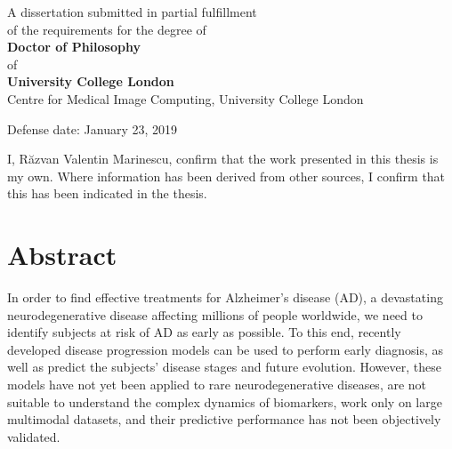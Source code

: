 \documentclass[12pt,a4paper,twoside]{book}
\begin{document}
\begin{titlepage}
\begin{center}
{\vfill
 
A dissertation submitted in partial fulfillment \\
of the requirements for the degree of\\[0.3cm]
\textbf{Doctor of Philosophy}\\[0.3cm]
of\\[0.3cm]
\textbf{University College London}\\[1cm]

Centre for Medical Image Computing, University College London
 
 \vfill
% 
% 

{\Large Defense date: January 23, 2019} %

}
\end{center}
\end{titlepage}


\clearpage


I, R\u{a}zvan Valentin Marinescu, confirm that the work presented in this thesis is my own. Where information has been derived from other sources, I confirm that this has been indicated in the thesis.

\clearpage


\chapter*{Abstract}

In order to find effective treatments for Alzheimer's disease (AD), a devastating neurodegenerative disease affecting millions of people worldwide, we need to identify subjects at risk of AD as early as possible. To this end, recently developed disease progression models can be used to perform early diagnosis, as well as predict the subjects' disease stages and future evolution. However, these models have not yet been applied to rare neurodegenerative diseases, are not suitable to understand the complex dynamics of biomarkers, work only on large multimodal datasets, and their predictive performance has not been objectively validated.
\end{document}

